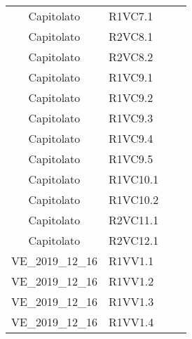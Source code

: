 {\begin{longtable}{ c C{4cm} c c}
Capitolato & R1VC7.1\\

Capitolato & R2VC8.1\\

Capitolato & R2VC8.2\\

Capitolato & R1VC9.1\\

Capitolato & R1VC9.2\\

Capitolato & R1VC9.3\\

Capitolato & R1VC9.4\\

Capitolato & R1VC9.5\\

Capitolato & R1VC10.1\\

Capitolato & R1VC10.2\\

Capitolato & R2VC11.1\\

Capitolato & R2VC12.1\\


VE\_2019\_12\_16 & R1VV1.1\\

VE\_2019\_12\_16 & R1VV1.2\\

VE\_2019\_12\_16 & R1VV1.3\\

VE\_2019\_12\_16 & R1VV1.4\\


\end{longtable}
}



